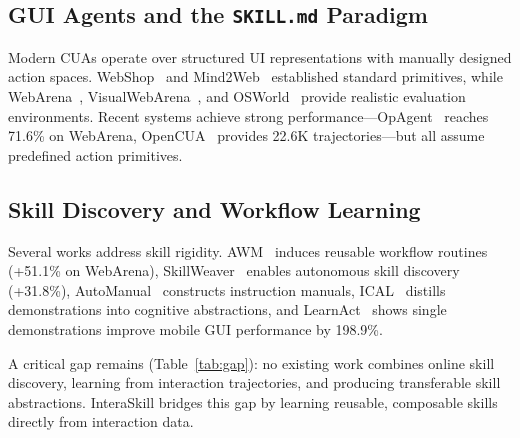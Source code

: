 \documentclass{article}
\begin{document}
\subsection{GUI Agents and the \texttt{SKILL.md} Paradigm}

Modern CUAs operate over structured UI representations with manually designed action spaces. WebShop~\cite{yao2022webshop} and Mind2Web~\cite{deng2023mind2web} established standard primitives, while WebArena~\cite{zhou2024webarena}, VisualWebArena~\cite{koh2024visualwebarena}, and OSWorld~\cite{xie2024osworld} provide realistic evaluation environments. Recent systems achieve strong performance---OpAgent~\cite{guo2026opagent} reaches 71.6\% on WebArena, OpenCUA~\cite{wang2025opencua} provides 22.6K trajectories---but all assume predefined action primitives.

\subsection{Skill Discovery and Workflow Learning}

Several works address skill rigidity. AWM~\cite{wang2024awm} induces reusable workflow routines (+51.1\% on WebArena), SkillWeaver~\cite{zheng2025skillweaver} enables autonomous skill discovery (+31.8\%), AutoManual~\cite{chen2024automanual} constructs instruction manuals, ICAL~\cite{sarch2024ical} distills demonstrations into cognitive abstractions, and LearnAct~\cite{liu2025learnact} shows single demonstrations improve mobile GUI performance by 198.9\%.

A critical gap remains (Table~\ref{tab:gap}): no existing work combines online skill discovery, learning from interaction trajectories, and producing transferable skill abstractions. InteraSkill bridges this gap by learning reusable, composable skills directly from interaction data.
\end{document}
